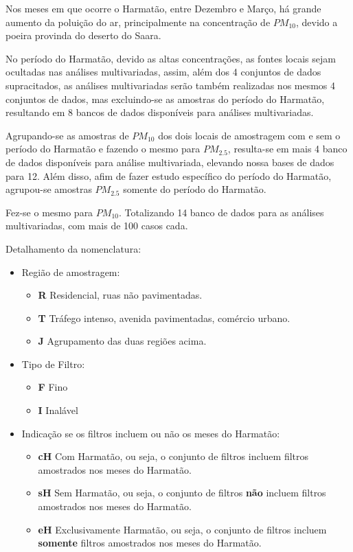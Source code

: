 Nos meses em que ocorre o Harmatão, entre Dezembro e Março, há grande aumento da
poluição do ar, principalmente na concentração de $PM_{10}$, devido a poeira 
provinda do deserto do Saara. 

No período do Harmatão, devido as altas concentrações, as fontes locais sejam 
ocultadas nas análises multivariadas, assim, além dos 4 conjuntos de dados 
supracitados, as análises multivariadas serão também realizadas nos mesmos 4 
conjuntos de dados, mas excluindo-se as amostras do período do Harmatão, 
resultando em 8 bancos de dados disponíveis para análises multivariadas. 

Agrupando-se as amostras de $PM_{10}$ dos dois locais de amostragem com e sem 
o período do Harmatão e fazendo o mesmo para $PM_{2.5}$, resulta-se em mais 4 
banco de dados disponíveis para análise multivariada, elevando nossa bases de
dados para 12. Além disso, afim de fazer estudo específico do período do 
Harmatão, agrupou-se amostras $PM_{2.5}$ somente do período do Harmatão. 

Fez-se o mesmo para $PM_{10}$. Totalizando 14 banco de dados para as análises 
multivariadas, com mais de 100 casos cada.  

Detalhamento da nomenclatura: 
\begin{itemize}
\item Região de amostragem: 
	\begin{itemize}
	\item \textbf{R} Residencial, ruas não pavimentadas. 
	\item \textbf{T} Tráfego intenso, avenida pavimentadas, comércio urbano.
	\item \textbf{J} Agrupamento das duas regiões acima.
	\end{itemize}
\item Tipo de Filtro:
	\begin{itemize}
	\item \textbf{F} Fino
	\item \textbf{I} Inalável
	\end{itemize}
\item Indicação se os filtros incluem ou não os meses do Harmatão:
	\begin{itemize}
	\item \textbf{cH} Com Harmatão, ou seja, o conjunto de filtros 
        incluem filtros amostrados nos meses do Harmatão.
	\item \textbf{sH} Sem Harmatão, ou seja, o conjunto de filtros \textbf{não} 
        incluem filtros amostrados nos meses do Harmatão.
	\item \textbf{eH} Exclusivamente Harmatão, ou seja, o conjunto de filtros 
        incluem \textbf{somente} filtros amostrados nos meses do Harmatão.
	\end{itemize}
\end{itemize}
